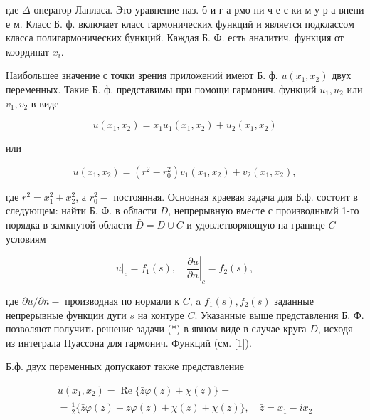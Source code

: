 \documentclass[10pt]{article}
\begin{document}
где $\Delta$-оператор Лапласа. Это уравнение наз. б и г а рмо ни ч е с ки м у р а внени е м. Класс Б. ф. включает класс гармонических функций и является подклассом класса полигармонических бункций. Каждая Б. Ф. есть аналитич. функция от координат $x_{i}$.



Наибольшее значение с точки зрения приложений имеют Б. ф. $u\left(x_{1}, x_{2}\right)$ двух переменных. Такие Б. ф. представимы при помощи гармонич. функций $u_{1}, u_{2}$ или $v_{1}, v_{2}$ в виде



\[

u\left(x_{1}, x_{2}\right)=x_{1} u_{1}\left(x_{1}, x_{2}\right)+u_{2}\left(x_{1}, x_{2}\right)

\]



или



\[

u\left(x_{1}, x_{2}\right)=\left(r^{2}-r_{0}^{2}\right) v_{1}\left(x_{1}, x_{2}\right)+v_{2}\left(x_{1}, x_{2}\right),

\]



где $r^{2}=x_{1}^{2}+x_{2}^{2}$, а $r_{0}^{2}-$ постоянная. Основная краевая задача для Б.ф. состоит в следующем: найти Б. Ф. в об̈ласти $D$, непрерывную вместе с производнымй 1-го порядка в замкнутой области $\bar{D}=D \cup C$ и удовлетворяющую на границе $C$ условиям



\[

\left.u\right|_{c}=f_{1}(s),\left.\quad \frac{\partial u}{\partial n}\right|_{c}=f_{2}(s),

\]



где $\partial u / \partial n-$ производная по нормали к $C$, a $f_{1}(s), f_{2}(s)$ заданные непрерывные функции дуги $s$ на контуре $C$. Указанные выше представления Б. Ф. позволяют получить решение задачи (*) в явном виде в случае круга $D$, исходя из интеграла Пуассона для гармонич. Функций (см. [1]).



Б.ф. двух переменных допускают также представление



\[

\begin{gathered}

u\left(x_{1}, x_{2}\right)=\operatorname{Re}\{\bar{z} \varphi(z)+\chi(z)\}= \\

=\frac{1}{2}\{\bar{z} \varphi(z)+z \overline{\varphi(z)}+\chi(z)+\overline{\chi(z)}\}, \quad \bar{z}=x_{1}-i x_{2}

\end{gathered}

\]
\end{document}
